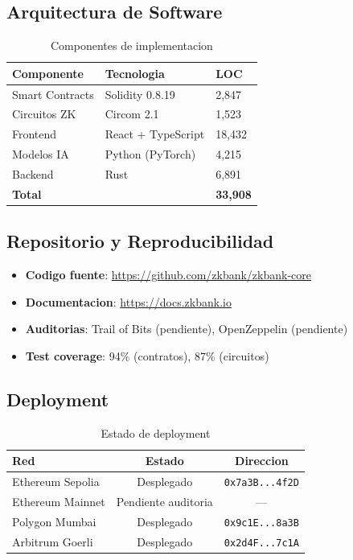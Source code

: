 \documentclass[11pt]{article}
\theoremstyle{definition}
\theoremstyle{plain}
\theoremstyle{remark}
\begin{document}
\subsection{Arquitectura de Software}

\begin{table}[H]
\centering
\caption{Componentes de implementacion}
\label{tab:implementation}
\begin{tabular}{lll}
\toprule
\textbf{Componente} & \textbf{Tecnologia} & \textbf{LOC} \\
\midrule
Smart Contracts & Solidity 0.8.19 & 2,847 \\
Circuitos ZK & Circom 2.1~\cite{circom2022} & 1,523 \\
Frontend & React + TypeScript & 18,432 \\
Modelos IA & Python (PyTorch) & 4,215 \\
Backend & Rust & 6,891 \\
\midrule
\textbf{Total} & & \textbf{33,908} \\
\bottomrule
\end{tabular}
\end{table}

\subsection{Repositorio y Reproducibilidad}

\begin{itemize}
    \item \textbf{Codigo fuente}: \url{https://github.com/zkbank/zkbank-core}
    \item \textbf{Documentacion}: \url{https://docs.zkbank.io}
    \item \textbf{Auditorias}: Trail of Bits (pendiente), OpenZeppelin (pendiente)
    \item \textbf{Test coverage}: 94\% (contratos), 87\% (circuitos)
\end{itemize}

\subsection{Deployment}

\begin{table}[H]
\centering
\caption{Estado de deployment}
\label{tab:deployment}
\begin{tabular}{lcc}
\toprule
\textbf{Red} & \textbf{Estado} & \textbf{Direccion} \\
\midrule
Ethereum Sepolia & Desplegado & \texttt{0x7a3B...4f2D} \\
Ethereum Mainnet & Pendiente auditoria & --- \\
Polygon Mumbai & Desplegado & \texttt{0x9c1E...8a3B} \\
Arbitrum Goerli & Desplegado & \texttt{0x2d4F...7c1A} \\
\bottomrule
\end{tabular}
\end{table}
\end{document}
